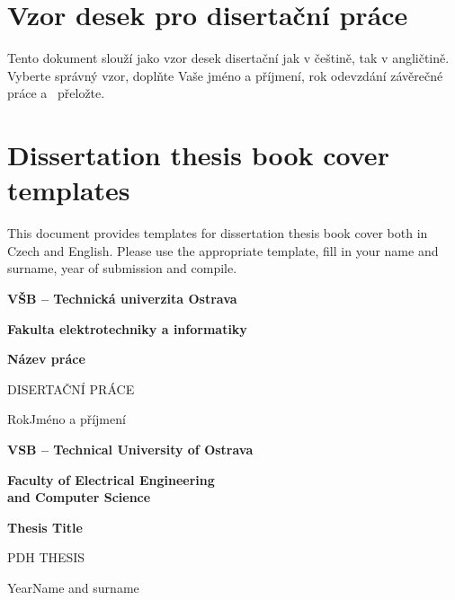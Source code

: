\documentclass[11pt]{article}
\newcommand{\BookCover}[7]
{
	\sffamily
	\begin{center}
		\Huge
		\textbf{#1}\par\medskip
		\textbf{#2}\par
		\vspace{#3}
		\textbf{#4}\par\bigskip
		#5
	\end{center}
	\vfill
	{\Huge#6\hfill#7}
	\clearpage
}
\begin{document}
\section*{Vzor desek pro disertační práce}
Tento dokument slouží jako vzor desek disertační jak v češtině, tak v angličtině. Vyberte správný vzor, doplňte Vaše jméno a příjmení, rok odevzdání závěrečné práce a~ přeložte.

\section*{Dissertation thesis book cover templates}
This document provides templates for dissertation thesis book cover both in Czech and English. Please use the appropriate template, fill in your name and surname, year of submission and compile.

\clearpage

\BookCover{VŠB -- Technická univerzita Ostrava}{Fakulta elektrotechniky a informatiky}{64mm}{Název práce}{DISERTAČNÍ PRÁCE}{Rok}{Jméno a příjmení}

\BookCover{VSB -- Technical University of Ostrava}{Faculty of Electrical Engineering\\and Computer Science}{54mm}{Thesis Title}{PDH THESIS}{Year}{Name and surname}
\end{document}
